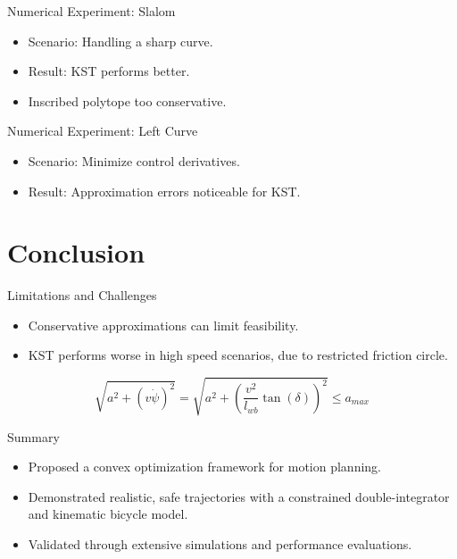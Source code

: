 \documentclass[shortpres,aspectratio=43]{beamer}
\begin{document}
\begin{frame}{Numerical Experiment: Slalom}
  \begin{itemize}
    \item Scenario: Handling a sharp curve.
    \item Result: KST performs better.
    \item Inscribed polytope too conservative.
  \end{itemize}
\end{frame}

\begin{frame}{Numerical Experiment: Left Curve}
  \begin{itemize}
    \item Scenario: Minimize control derivatives.
    \item Result: Approximation errors noticeable for KST.
  \end{itemize}
\end{frame}

\section{Conclusion}

\begin{frame}{Limitations and Challenges}
  \begin{itemize}
    \item Conservative approximations can limit feasibility.
    \item KST performs worse in high speed scenarios, due to restricted friction circle.
  \end{itemize}
  \begin{equation}
    \sqrt{a^2 + \left(v\dot{\psi}\right)^2} = \sqrt{a^2 + \left(\frac{v^2}{l_{wb}} \tan(\delta)\right)^2} \leq a_{max}
  \end{equation}
\end{frame}

\begin{frame}{Summary}
  \begin{itemize}
    \item Proposed a convex optimization framework for motion planning.
    \item Demonstrated realistic, safe trajectories with a constrained double-integrator and kinematic bicycle model.
    \item Validated through extensive simulations and performance evaluations.
  \end{itemize}
\end{frame}
\end{document}
